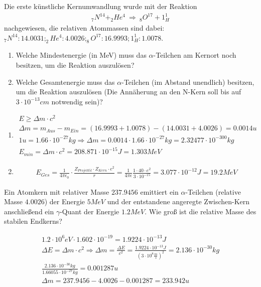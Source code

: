 \documentclass[12pt,a4paper,ngerman]{article}
\begin{document}
\begin{framed}
Die erste künstliche Kernumwandlung wurde mit der Reaktion
\begin{align*}
_7N^{14} + _2He^4 \ \Rightarrow \ _8O^{17} + 1_H^1
\end{align*}
nachgewiesen, die relativen Atommassen sind dabei: \\$_7N^{14}:14.0031; _2He^4:4.0026; _8O^{17}:16.9993; 1_H^1:1.0078$. 
\begin{enumerate}
\item Welche Mindestenergie (in MeV) muss das $\alpha$-Teilchen am Kernort noch besitzen, um die Reaktion auszulösen?
\item Welche Gesamtenergie muss das $\alpha$-Teilchen (im Abstand unendlich) besitzen, um die Reaktion auszulösen (Die Annäherung an den N-Kern soll bis auf $3 \cdot 10^{-13}cm$ notwendig sein)?
\end{enumerate}
\end{framed}

\begin{enumerate}
\item \begin{gather*}
E \geq \Delta m \cdot c^2 \\
\Delta m = m_{Aus} - m_{Ein} = (16.9993+1.0078)-(14.0031+4.0026) = 0.0014u \\
1u = 1.66 \cdot 10^{-27}kg \Rightarrow \Delta m = 0.0014 \cdot 1.66 \cdot 10^{-27}kg = 2.32477 \cdot 10^{-300}kg \\
E_{min} = \Delta m \cdot c^2 = 208.871 \cdot 10^{-15}J = 1.303 MeV
\end{gather*}
\item \begin{gather*}
E_{Ges} = \frac{1}{4 \pi \epsilon_0}\cdot \frac{Z_{Projektil} \cdot Z_{Kern}\cdot e^2}{r} = \frac{1}{4 \pi \epsilon}\frac{1\cdot 40 \cdot e^2}{3\cdot 10^{-15}} = 3.077 \cdot 10^{-12}J = 19.2 MeV
\end{gather*}
\end{enumerate}

\pagebreak

\begin{framed}
Ein Atomkern mit relativer Masse $237.9456$ emittiert ein $\alpha$-Teilchen (relative Masse $4.0026$) der Energie $5MeV$ und der entstandene angeregte Zwischen-Kern anschließend ein $\gamma$-Quant der Energie $1.2MeV$. Wie groß ist die relative Masse des stabilen Endkerns?
\end{framed}

\begin{gather*}
1.2 \cdot 10^6 eV \cdot 1.602 \cdot 10^{-19} = 1.9224 \cdot 10^{-13}J \\
\Delta E = \Delta m \cdot c^2 \Rightarrow \Delta m = \frac{\Delta E}{c^2} = \frac{1.9224 \cdot 10^{-13}J}{(3 \cdot 10^8 \frac{m}{s})^2} = 2.136 \cdot 10^{-30}kg \\
\frac{2.136 \cdot 10^{-30}kg}{1.66055 \cdot 10^{-27}kg} = 0.001287u \\
\Delta m = 237.9456 - 4.0026 - 0.001287 = 233.942u
\end{gather*}
\end{document}
